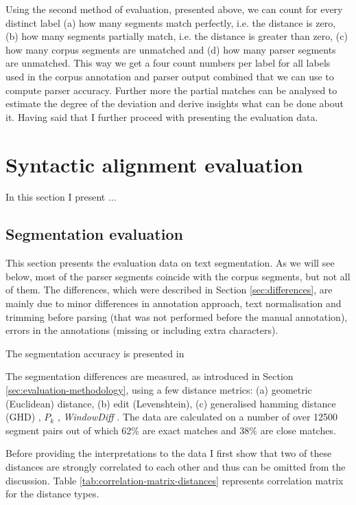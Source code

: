     Using the second method of evaluation, presented above, we can count for every distinct label (a) how many segments match perfectly, i.e. the distance is zero, (b) how many segments partially match, i.e. the distance is greater than zero, (c) how many corpus segments are unmatched and (d) how many parser segments are unmatched. This way we get a four count numbers per label for all labels used in the corpus annotation and parser output combined that we can use to compute parser accuracy. Further more the partial matches can be analysed to estimate the degree of the deviation and derive insights what can be done about it. Having said that I further proceed with presenting the evaluation data. 

\section{Syntactic alignment evaluation}
    In this section I present ...
    
\subsection{Segmentation evaluation}
\label{sec:segmentation-evaluation}
    
    This section presents the evaluation data on text segmentation. As we will see below, most of the parser segments coincide with the corpus segments, but not all of them. The differences, which were described in Section \ref{sec:differences}, are mainly due to minor differences in annotation approach, text normalisation and trimming before parsing (that was not performed before the manual annotation), errors in the annotations (missing or including extra characters). 
    
    The segmentation accuracy is presented in 
    
    The segmentation differences are measured, as introduced in Section \ref{sec:evaluation-methodology}, using a few distance metrics: (a) geometric (Euclidean) distance, (b) edit (Levenshtein), (c) generalised hamming distance (GHD) \citep{Bookstein2002}, $P_k$ \citep[198--200]{beeferman1999statistical}, \textit{WindowDiff} \citep[10]{pevzner2002critique}. 
    The data are calculated on a number of over 12500 segment pairs out of which 62\% are exact matches and 38\% are close matches. 
    
    Before providing the interpretations to the data I first show that two of these distances are strongly correlated to each other and thus can be omitted from the discussion. Table \ref{tab:correlation-matrix-distances} represents correlation matrix for the distance types. 
    
